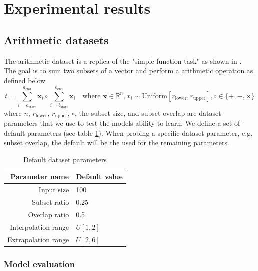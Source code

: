 \section{Experimental results}
\label{sec:experiments}

\subsection{Arithmetic datasets}

The arithmetic dataset is a replica of the "simple function task" as shown in \cite{trask-nalu}.
The goal is to sum two subsets of a vector and perform a arithmetic operation as defined below
\begin{equation}
t = \sum_{i = a_{\mathrm{start}}}^{a_{\mathrm{end}}} \mathbf{x}_i \circ \sum_{i = b_{\mathrm{start}}}^{b_{\mathrm{end}}} \mathbf{x}_i \quad \text{where } \mathbf{x} \in \mathbb{R}^n, x_i \sim \mathrm{Uniform}[r_{\mathrm{lower}}, r_{\mathrm{upper}}], \circ \in \{+, -, \times\}
\label{eq:arithmetic-problem}
\end{equation}
where $n$, $r_{\mathrm{lower}}$, $r_{\mathrm{upper}}$, $\circ$, the subset size, and subset overlap are dataset parameters that we use to test the models ability to learn.
We define a set of default parameters (see table \ref{tab:simple-function-task-defaults}).
When probing a specific dataset parameter, e.g. subset overlap, the default will be the used for the remaining parameters.
\begin{table}[h]
\caption{Default dataset parameters}
\label{tab:simple-function-task-defaults}
\centering
\begin{tabular}{r l}
\toprule
 Parameter name & Default value \\
 \midrule
 Input size & 100 \\
 Subset ratio & 0.25 \\
 Overlap ratio & 0.5 \\
 Interpolation range & $U[1,2]$ \\
 Extrapolation range & $U[2,6]$ \\
 \bottomrule
\end{tabular}
\end{table}

\subsubsection{Model evaluation}

